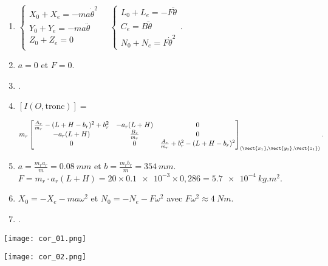 \begin{multicols}{2}
\begin{enumerate}
\item $
\left\{ \begin{array}{l}
X_0 + X_e = - m a \dot{\theta}^2 \\
Y_0 + Y_e = - m a \ddot{\theta} \\
Z_0 + Z_e = 0 \\
\end{array}
\right.
\quad
\left\{ \begin{array}{l}
L_0 +L_e = -F \ddot{\theta} \\
C_e = B \ddot{\theta} \\
N_0 +N_e= F \dot{\theta}^2
\end{array}
\right. .
$

\item $a=0$ et $F=0$.

\item .%

\item 
$\left[I(O,\text{tronc})\right]=$

$m_r 
\begin{bmatrix}
\frac{A_r}{m_r}-(L+H-b_r)^2+b_r^2 & -a_r(L+H) & 0 \\ 
-a_r(L+H) & \frac{B_r}{m_r} & 0 \\ 
0 & 0 & \frac{A_r}{m_r}+b_r^2-(L+H-b_r)^2
\end{bmatrix}_{(\vect {x_1},\vect{y_0},\vect{z_1})}.$

\item $a=\frac{m_r a_r}{m}=\SI{0.08}{mm}$ et $b=\frac{m_r b_r}{m}=\SI{354}{mm}$.
 $F=m_r\cdot a_r(L+H)=20\times \num{0,1e-3} \times 0,286=\SI{5.7e-4}{kg.m^2}$. 

\item  $X_0=- X_e - m a \omega^2$  et $N_0=-N_e-F \omega^2$ avec $F \omega^2\approx \SI{4}{Nm}$. 

\item .

\end{enumerate}
\end{multicols}

\fi

\ifprof

\begin{center}
\texttt{[image: cor\_01.png]}
\end{center}
\begin{center}
\texttt{[image: cor\_02.png]}
\end{center}

\else
\fi
